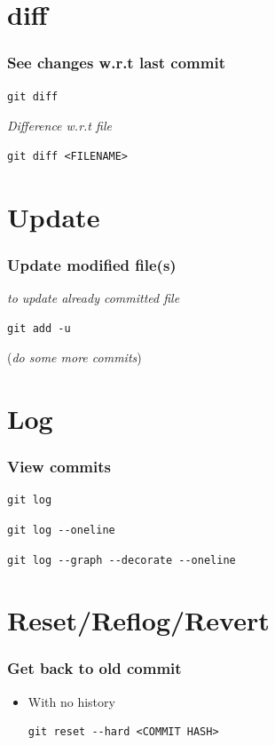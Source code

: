 \documentclass[bigger, presentation]{beamer}
\begin{document}
\section{diff}
\label{sec-6}
\begin{frame}[fragile]
\frametitle{See changes w.r.t last commit}
\label{sec-6-1}

   

\begin{verbatim}
git diff
\end{verbatim}

   \emph{Difference w.r.t file}

\begin{verbatim}
git diff <FILENAME>
\end{verbatim}
\end{frame}
\section{Update}
\label{sec-7}
\begin{frame}[fragile]
\frametitle{Update modified file(s)}
\label{sec-7-1}

   
   \emph{to update already committed file}

\begin{verbatim}
git add -u
\end{verbatim}

   (\emph{do some more commits})
\end{frame}
\section{Log}
\label{sec-8}
\begin{frame}[fragile]
\frametitle{View commits}
\label{sec-8-1}


\begin{verbatim}
git log
\end{verbatim}


\begin{verbatim}
git log --oneline
\end{verbatim}


\begin{verbatim}
git log --graph --decorate --oneline
\end{verbatim}
\end{frame}
\section{Reset/Reflog/Revert}
\label{sec-9}
\begin{frame}[fragile]
\frametitle{Get back to old commit}
\label{sec-9-1}
\begin{itemize}

\item With no history\\
\label{sec-9-1-1}%
\begin{verbatim}
git reset --hard <COMMIT HASH>
\end{verbatim}

\end{itemize} %
\end{frame}
\end{document}
